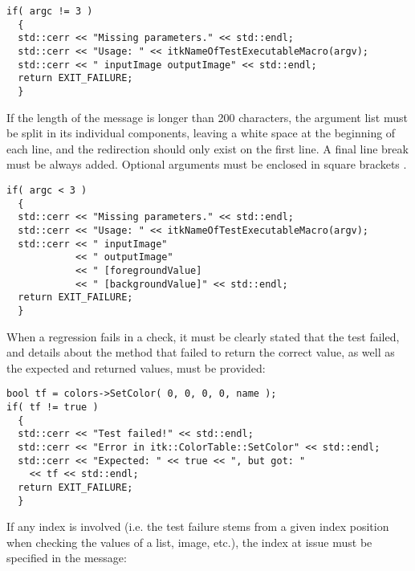 \small
\begin{verbatim}
if( argc != 3 )
  {
  std::cerr << "Missing parameters." << std::endl;
  std::cerr << "Usage: " << itkNameOfTestExecutableMacro(argv);
  std::cerr << " inputImage outputImage" << std::endl;
  return EXIT_FAILURE;
  }
\end{verbatim}
\normalsize

If the length of the message is longer than 200 characters, the argument list
must be split in its individual components, leaving a white space at the
beginning of each line, and the  redirection should only
exist on the first line. A final line break must be always added. Optional
arguments must be enclosed in square brackets \code{[]}.

\small
\begin{verbatim}
if( argc < 3 )
  {
  std::cerr << "Missing parameters." << std::endl;
  std::cerr << "Usage: " << itkNameOfTestExecutableMacro(argv);
  std::cerr << " inputImage"
            << " outputImage"
            << " [foregroundValue]
            << " [backgroundValue]" << std::endl;
  return EXIT_FAILURE;
  }
\end{verbatim}
\normalsize

When a regression fails in a check, it must be clearly stated that the test
failed, and details about the method that failed to return the correct value,
as well as the expected and returned values, must be provided:

\small
\begin{verbatim}
bool tf = colors->SetColor( 0, 0, 0, 0, name );
if( tf != true )
  {
  std::cerr << "Test failed!" << std::endl;
  std::cerr << "Error in itk::ColorTable::SetColor" << std::endl;
  std::cerr << "Expected: " << true << ", but got: "
    << tf << std::endl;
  return EXIT_FAILURE;
  }
\end{verbatim}
\normalsize

If any index is involved (i.e. the test failure stems from a given index
position when checking the values of a list, image, etc.), the index at issue
must be specified in the message:


